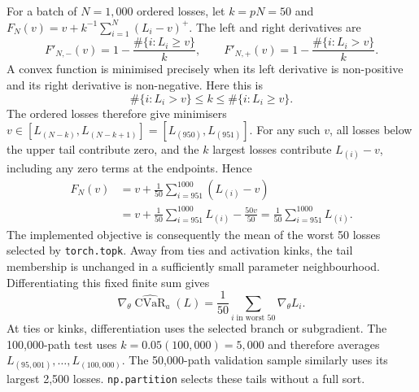 \documentclass[11pt,a4paper]{article}
\newcommand{\CVaR}{\operatorname{CVaR}}
\theoremstyle{remark}
\begin{document}
For a batch of $N=1,000$ ordered losses, let $k=pN=50$ and
$F_N(v)=v+k^{-1}\sum_{i=1}^N(L_i-v)^+$. The left and right derivatives are
\begin{equation}
 F'_{N,-}(v)=1-\frac{\#\{i:L_i\geq v\}}k,\qquad
 F'_{N,+}(v)=1-\frac{\#\{i:L_i>v\}}k.
\end{equation}
A convex function is minimised precisely when its left derivative is non-positive and its right derivative is non-negative. Here this is
\begin{equation}
 \#\{i:L_i>v\}\leq k\leq\#\{i:L_i\geq v\}.
\end{equation}
The ordered losses therefore give minimisers
$v\in[L_{(N-k)},L_{(N-k+1)}]=[L_{(950)},L_{(951)}]$.
For any such $v$, all losses below the upper tail contribute zero, and the $k$ largest losses contribute $L_{(i)}-v$, including any zero terms at the endpoints. Hence
\begin{align}
 F_N(v)
 &=v+\frac1{50}\sum_{i=951}^{1000}(L_{(i)}-v)\nonumber\\
 &=v+\frac1{50}\sum_{i=951}^{1000}L_{(i)}
       -\frac{50v}{50}
 =\frac1{50}\sum_{i=951}^{1000}L_{(i)}.
 \label{eq:empiricalcvar}
\end{align}
The implemented objective is consequently the mean of the worst 50 losses selected by \texttt{torch.topk}. Away from ties and activation kinks, the tail membership is unchanged in a sufficiently small parameter neighbourhood. Differentiating this fixed finite sum gives
\begin{equation}
 \nabla_\theta\widehat{\CVaR}_a(L)
 =\frac1{50}\sum_{i\;\text{in worst 50}}\nabla_\theta L_i.
\end{equation}
At ties or kinks, differentiation uses the selected branch or subgradient. The 100,000-path test uses $k=0.05(100,000)=5,000$ and therefore averages $L_{(95,001)},\ldots,L_{(100,000)}$. The 50,000-path validation sample similarly uses its largest 2,500 losses. \texttt{np.partition} selects these tails without a full sort.
\end{document}
